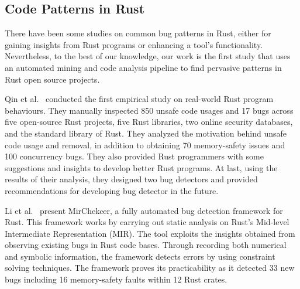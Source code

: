 \subsection{Code Patterns in Rust}

There have been some studies on common bug patterns in Rust, either for gaining insights from Rust programs or enhancing a tool's functionality. Nevertheless, to the best of our knowledge, our work is the first study that uses an automated mining and code analysis pipeline to find pervasive patterns in Rust open source projects.

Qin et al.~\cite{qin2020understanding} conducted the first empirical study on real-world Rust program behaviours. They manually inspected 850 unsafe code usages and 17 bugs across five open-source Rust projects, five Rust libraries, two online security databases, and the standard library of Rust. They analyzed the motivation behind unsafe code usage and removal, in addition to obtaining 70 memory-safety issues and 100 concurrency bugs. They also provided Rust programmers with some suggestions and insights to develop better Rust programs. At last, using the results of their analysis, they designed two bug detectors and provided recommendations for developing bug detector in the future.

Li et al.~\cite{li2021mirchecker} present MirChekcer, a fully automated bug detection framework for Rust. This framework works by carrying out static analysis on Rust's Mid-level Intermediate Representation (MIR). The tool exploits the insights obtained from observing existing bugs in Rust code bases. Through recording both numerical and symbolic information, the framework detects errors by using constraint solving techniques. The framework proves its practicability as it detected 33 new bugs including 16 memory-safety faults within 12 Rust crates.


